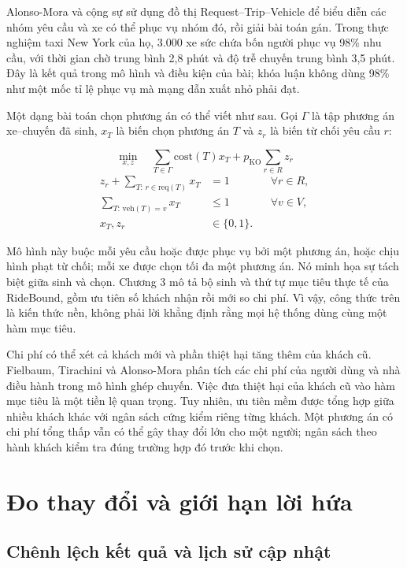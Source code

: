 Alonso-Mora và cộng sự \cite{alonsomora2017} sử dụng đồ thị
Request--Trip--Vehicle để biểu diễn các nhóm yêu cầu và xe có thể phục vụ nhóm đó,
rồi giải bài toán gán. Trong thực nghiệm taxi New York của họ, 3.000 xe sức chứa bốn
người phục vụ 98\% nhu cầu, với thời gian chờ trung bình 2,8 phút và độ trễ chuyến trung
bình 3,5 phút. Đây là kết quả trong mô hình và điều kiện của bài; khóa luận không dùng
98\% như một mốc tỉ lệ phục vụ mà mạng dẫn xuất nhỏ phải đạt.

Một dạng bài toán chọn phương án có thể viết như sau. Gọi $\Gamma$ là tập phương án
xe--chuyến đã sinh, $x_T$ là biến chọn phương án $T$ và $z_r$ là biến từ chối yêu cầu $r$:

\begin{equation}
\min_{x,z}\quad \sum_{T\in\Gamma}\mathrm{cost}(T)x_T
  +p_{\mathrm{KO}}\sum_{r\in R}z_r
\end{equation}
\begin{align}
z_r+\sum_{T:\,r\in\mathrm{req}(T)}x_T&=1 &&\forall r\in R,\\
\sum_{T:\,\mathrm{veh}(T)=v}x_T&\leq1 &&\forall v\in V,\\
x_T,z_r&\in\{0,1\}.&&
\end{align}

Mô hình này buộc mỗi yêu cầu hoặc được phục vụ bởi một phương án, hoặc chịu hình phạt
từ chối; mỗi xe được chọn tối đa một phương án. Nó minh họa sự tách biệt giữa sinh và chọn.
Chương 3 mô tả bộ sinh và thứ tự mục tiêu thực tế của RideBound, gồm ưu tiên số khách
nhận rồi mới so chi phí. Vì vậy, công thức trên là kiến thức nền, không phải lời khẳng
định rằng mọi hệ thống dùng cùng một hàm mục tiêu.

Chi phí có thể xét cả khách mới và phần thiệt hại tăng thêm của khách cũ. Fielbaum,
Tirachini và Alonso-Mora \cite{fielbaum2022scale} phân tích các chi phí của người dùng
và nhà điều hành trong mô hình ghép chuyến. Việc đưa thiệt hại của khách cũ vào hàm mục
tiêu là một tiền lệ quan trọng. Tuy nhiên, ưu tiên mềm được tổng hợp giữa nhiều khách
khác với ngân sách cứng kiểm riêng từng khách. Một phương án có chi phí tổng thấp vẫn
có thể gây thay đổi lớn cho một người; ngân sách theo hành khách kiểm tra đúng trường
hợp đó trước khi chọn.

\section{Đo thay đổi và giới hạn lời hứa}


\subsection{Chênh lệch kết quả và lịch sử cập nhật}

